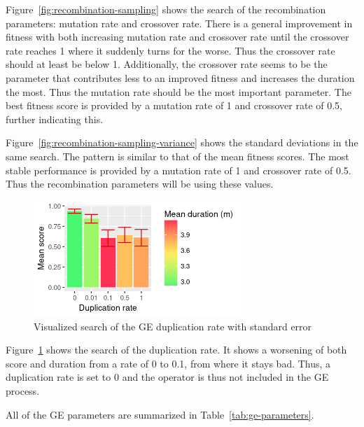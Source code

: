 Figure~\ref{fig:recombination-sampling} shows the search of the recombination parameters: mutation rate and crossover rate.
There is a general improvement in fitness with both increasing mutation rate and crossover rate until the crossover rate reaches 1 where it suddenly turns for the worse.
Thus the crossover rate should at least be below 1.
Additionally, the crossover rate seems to be the parameter that contributes less to an improved fitness and increases the duration the most.
Thus the mutation rate should be the most important parameter.
The best fitness score is provided by a mutation rate of 1 and crossover rate of 0.5, further indicating this.

Figure~\ref{fig:recombination-sampling-variance} shows the standard deviations in the same search.
The pattern is similar to that of the mean fitness scores.
The most stable performance is provided by a mutation rate of 1 and crossover rate of 0.5.
Thus the recombination parameters will be using these values.

\begin{figure}
    \centering
    \includegraphics[width=0.7\textwidth]{figures/ge-duplication-sampling}
    \caption[Visualized search of the GE duplication rate]{Visualized search of the \gls{GE} duplication rate with standard error}
    \label{fig:duplication-sampling}
\end{figure}

Figure~\ref{fig:duplication-sampling} shows the search of the duplication rate.
It shows a worsening of both score and duration from a rate of 0 to 0.1, from where it stays bad.
Thus, a duplication rate is set to 0 and the operator is thus not included in the \gls{GE} process.

All of the \gls{GE} parameters are summarized in Table~\ref{tab:ge-parameters}.

